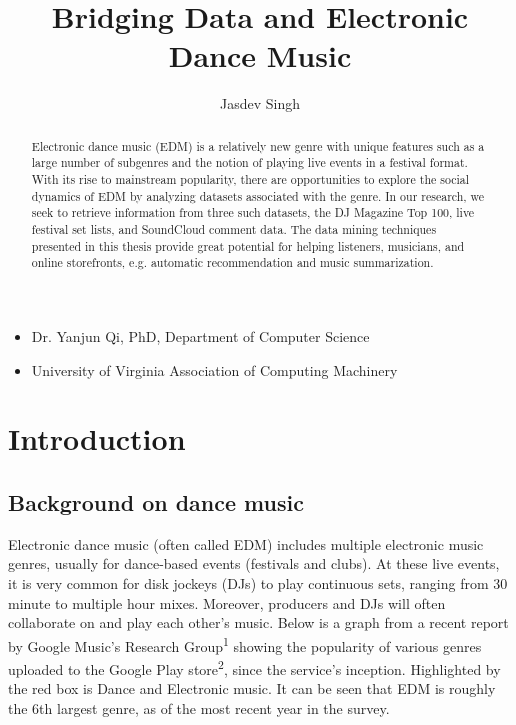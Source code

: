 \documentclass[12pt]{dalcsthesis}
\begin{document}
\mcs 
\title{Bridging Data and Electronic Dance Music}
\author{Jasdev Singh}


\nolistoftables
\nolistoffigures

\frontmatter

\begin{abstract}
Electronic dance music (EDM) is a relatively new genre with unique features such as a large number of subgenres and the  notion of playing live events in a festival format. With its rise to mainstream popularity, there are opportunities to explore the social dynamics of EDM by analyzing datasets associated with the genre. In our research, we seek to retrieve information from three such datasets, the DJ Magazine Top 100, live festival set lists, and SoundCloud comment data. The data mining techniques presented in this thesis provide great potential for helping listeners, musicians, and online storefronts, e.g. automatic recommendation and music summarization. 
\end{abstract}

\begin{acknowledgements}
\begin{itemize}
	\item Dr. Yanjun Qi, PhD, Department of Computer Science
	\item University of Virginia Association of Computing Machinery
\end{itemize}
\end{acknowledgements}

\mainmatter

\chapter{Introduction}

\section{Background on dance music}

Electronic dance music (often called EDM) includes multiple electronic music genres, usually for dance-based events (festivals and clubs). At these live events, it is very common for disk jockeys (DJs) to play continuous sets, ranging from 30 minute to multiple hour mixes. Moreover, producers and DJs will often collaborate on and play each other's music. Below is a graph from a recent report by Google Music's Research Group\textsuperscript{1} showing the popularity of various genres uploaded to the Google Play store\textsuperscript{2}, since the service's inception. Highlighted by the red box is Dance and Electronic music. It can be seen that EDM is roughly the 6th largest genre, as of the most recent year in the survey.
\end{document}
